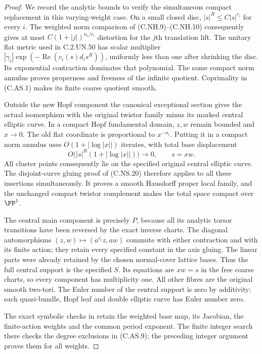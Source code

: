 \begin{proof}
We record the analytic bounds to
verify the simultaneous compact
replacement in this varying-weight
case. On a small closed disc,
$|s|^R\le C|s|^{r_i}$ for every $i$.
The weighted norm comparison of
(C.NH.9)--(C.NH.10) consequently
gives at most
$C(1+|j|)^{n_i/r_i}$ distortion
for the $j$th translation lift.
The unitary flat metric used in
C.2.UN.50 has scalar multiplier
$|\gamma_i|\exp(-\operatorname{Re}(c_i(s)d_i s^R))$,
uniformly less than one after
shrinking the disc. Its exponential
contraction dominates that polynomial.
The same compact norm annulus proves
properness and freeness of the
infinite quotient. Coprimality in
(C.AS.1) makes its finite coarse
quotient smooth.

Outside the new Hopf component the
canonical exceptional section gives
the actual isomorphism with the
original twistor family minus its
marked central elliptic curve.
In a compact Hopf fundamental domain,
$z,w$ remain bounded and $x\to0$.
The old flat coordinate is proportional
to $x^{-n_i}$. Putting it in a compact
norm annulus uses
$O(1+|\log|x||)$ iterates, with total
base displacement
\[
                   O\bigl(|s|^R(1+|\log|x||)\bigr)
                          \longrightarrow0,
                         \qquad s=xw.                   \tag{C.AS.19}
\]
All cluster points consequently lie
on the specified original central
elliptic curve. The disjoint-curve
gluing proof of (C.NS.20) therefore
applies to all these insertions
simultaneously. It proves a smooth
Hausdorff proper local family, and
the unchanged compact twistor
complement makes the total space
compact over $\PP^1$.

The central main component is
precisely $P$, because all its
analytic torsor transitions have
been reversed by the exact inverse
charts. The diagonal automorphisms
$(z,w)\mapsto(a^{r_i}z,aw)$ commute
with either contraction and with
its finite action; they retain
every specified constant in the
axis gluing. The linear parts were
already retained by the chosen
normal-cover lattice bases.
Thus the full central support is
the specified $S$. Its equations
are $xw=s$ in the free coarse
charts, so every component has
multiplicity one. All other fibres
are the original smooth two-tori.
The Euler number of the central
support is zero by additivity:
each quasi-bundle, Hopf leaf and
double elliptic curve has Euler
number zero.

The exact symbolic checks in
retain the weighted base map, its
Jacobian, the finite-action weights
and the common period exponent.
The finite integer search there
checks the degree exclusions in
(C.AS.9); the preceding integer
argument proves them for all weights.
\end{proof}



